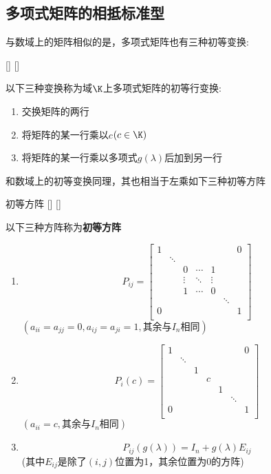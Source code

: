 \documentclass[UTF8]{ctexart}
\begin{document}
    \subsection{多项式矩阵的相抵标准型}
        与数域上的矩阵相似的是，多项式矩阵也有三种初等变换:
        \begin{dfn}
			[]
			{}
			[]
			[]
			
			以下三种变换称为域$\K$上多项式矩阵的初等行变换:
        	\begin{enumerate}
        	\item 交换矩阵的两行
        	\item  将矩阵的某一行乘以$c$$(c\in \K)$
        	\item 将矩阵的某一行乘以多项式$g(\lambda)$后加到另一行
        	\end{enumerate}
        \end{dfn}
        和数域上的初等变换同理，其也相当于左乘如下三种初等方阵
        \begin{dfn}
			[]
			{初等方阵}
			[]
			[]
			
			以下三种方阵称为\textbf{初等方阵}
        \begin{enumerate}
            \item \[P_{ij}=\begin{bmatrix}
			1 & & & & & & 0\\
			 &\ddots & & & & & \\
			 & & 0 & \cdots & 1 & & \\
			 & &\vdots &\ddots &\vdots & & \\
			 & & 1 & \cdots & 0 & & \\
			 & & & & &\ddots & \\
			0 & & & & & & 1\\
			\end{bmatrix}\]   $(a_{ii}=a_{jj}=0,a_{ij}=a_{ji}=1, \text{其余与}I_n\text{相同})$
           \item \[P_{i}(c)=\begin{bmatrix}
			1 & & & & & & 0\\
			 &\ddots & & & & & \\
			 & & 1 & & & & \\
			 & & & c & & & \\
			 & & & & 1 & & \\
			 & & & & & \ddots & \\
			0 & & & & & & 1\\
			\end{bmatrix}\]$(a_{ii}=c, \text{其余与}I_n\text{相同})$
         \item \[P_{ij}(g(\lambda))=I_n+g(\lambda)E_{ij}\]
        (其中$E_{ij}$是除了$(i,j)$位置为1，其余位置为0的方阵)
            
        \end{enumerate}
        
        \end{dfn}
\end{document}
